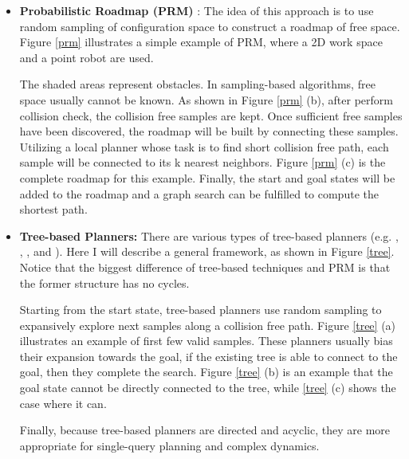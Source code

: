\begin{itemize}
    \item \textbf{Probabilistic Roadmap (PRM)} \citep{Kavraki1996ProbabilisticRF}: The idea of this approach is to use random sampling of configuration space to construct a roadmap of free space. Figure \ref{prm} illustrates a simple example of PRM, where a 2D work space and a point robot are used.
    
    The shaded areas represent obstacles. In sampling-based algorithms, free space usually cannot be known. As shown in Figure \ref{prm} (b), after perform collision check, the collision free samples are kept. Once sufficient free samples have been discovered, the roadmap will be built by connecting these samples. Utilizing a local planner whose task is to find short collision free path, each sample will be connected to its k nearest neighbors. Figure \ref{prm} (c) is the complete roadmap for this example. Finally, the start and goal states will be added to the roadmap and a graph search can be fulfilled to compute the shortest path.
    
    \item \textbf{Tree-based Planners:} There are various types of tree-based planners (e.g. \citep{RRT}, \citep{Sucan2012AST}, \citep{inproceedings}, and \citep{hsu}). Here I will describe a general framework, as shown in Figure \ref{tree}. Notice that the biggest difference of tree-based techniques and PRM is that the former structure has no cycles.
    
    Starting from the start state, tree-based planners use random sampling to expansively explore next samples along a collision free path. Figure \ref{tree} (a) illustrates an example of first few valid samples. These planners usually bias their expansion towards the goal, if the existing tree is able to connect to the goal, then they complete the search. Figure \ref{tree} (b) is an example that the goal state cannot be directly connected to the tree, while \ref{tree} (c) shows the case where it can.
    
    Finally, because tree-based planners are directed and acyclic, they are more appropriate for single-query planning and complex dynamics.
\end{itemize}

